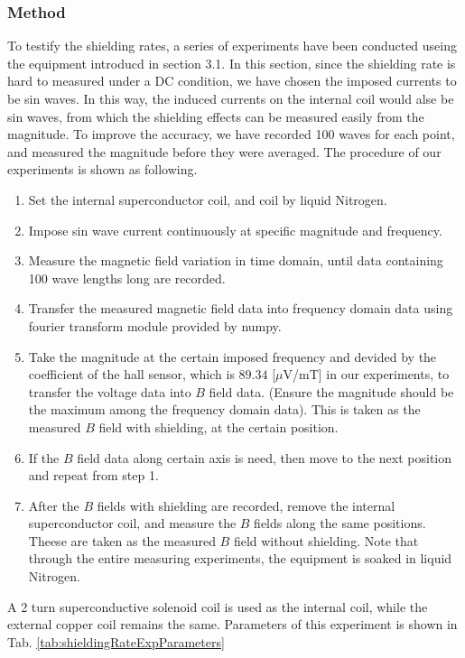 \subsubsection{Method}
To testify the shielding rates, a series of experiments have been conducted useing the equipment introducd in section 3.1.
In this section, since the shielding rate is hard to measured under a DC condition,
we have chosen the imposed currents to be sin waves.
In this way, the induced currents on the internal coil would alse be sin waves,
from which the shielding effects can be measured easily from the magnitude.
To improve the accuracy, we have recorded 100 waves for each point, and measured the magnitude before they were averaged.
The procedure of our experiments is shown as following.
\begin{enumerate}
  \item Set the internal superconductor coil, and coil by liquid Nitrogen.
  \item Impose sin wave current continuously at specific magnitude and frequency.
  \item Measure the magnetic field variation in time domain, until data containing 100 wave lengths long are recorded.
  \item Transfer the measured magnetic field data into frequency domain data using fourier transform module provided by numpy.
  \item Take the magnitude at the certain imposed frequency and devided by the coefficient of the hall sensor,
  which is $89.34$ [$\mu$V/mT] in our experiments,
  to transfer the voltage data into $B$ field data.
  (Ensure the magnitude should be the maximum among the frequency domain data).
  This is taken as the measured $B$ field with shielding, at the certain position.
  \item If the $B$ field data along certain axis is need, then move to the next position and repeat from step 1.
  \item After the $B$ fields with shielding are recorded, remove the internal superconductor coil,
  and measure the $B$ fields along the same positions.
  Theese are taken as the measured $B$ field without shielding.
  Note that through the entire measuring experiments, the equipment is soaked in liquid Nitrogen.
\end{enumerate}
A 2 turn superconductive solenoid coil is used as the internal coil, while the external copper coil remains the same.
Parameters of this experiment is shown in Tab. \ref{tab:shieldingRateExpParameters}
